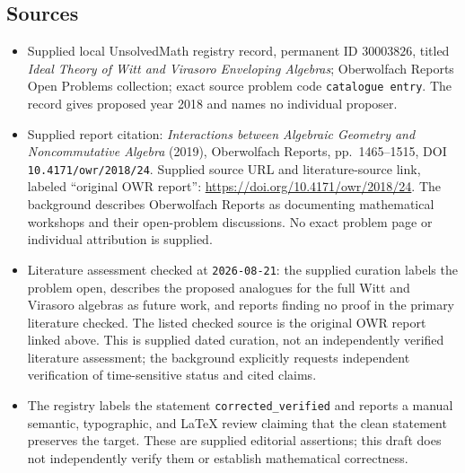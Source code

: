 \documentclass[11pt]{article}
\begin{document}
\subsection{Sources}
\begin{itemize}
\item Supplied local UnsolvedMath registry record, permanent ID \(30003826\), titled \emph{Ideal Theory of Witt and Virasoro Enveloping Algebras}; Oberwolfach Reports Open Problems collection; exact source problem code \texttt{catalogue entry}. The record gives proposed year 2018 and names no individual proposer.
\item Supplied report citation: \emph{Interactions between Algebraic Geometry and Noncommutative Algebra} (2019), Oberwolfach Reports, pp.\ 1465--1515, DOI \texttt{10.4171/owr/2018/24}. Supplied source URL and literature-source link, labeled ``original OWR report'': \url{https://doi.org/10.4171/owr/2018/24}. The background describes Oberwolfach Reports as documenting mathematical workshops and their open-problem discussions. No exact problem page or individual attribution is supplied.
\item Literature assessment checked at \texttt{2026-08-21}: the supplied curation labels the problem open, describes the proposed analogues for the full Witt and Virasoro algebras as future work, and reports finding no proof in the primary literature checked. The listed checked source is the original OWR report linked above. This is supplied dated curation, not an independently verified literature assessment; the background explicitly requests independent verification of time-sensitive status and cited claims.
\item The registry labels the statement \texttt{corrected\_verified} and reports a manual semantic, typographic, and LaTeX review claiming that the clean statement preserves the target. These are supplied editorial assertions; this draft does not independently verify them or establish mathematical correctness.
\end{itemize}
\end{document}
